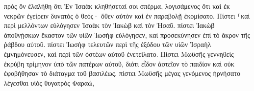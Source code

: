 \documentclass{openreader}
\begin{document}
πρὸς ὃν ἐλαλήθη ὅτι Ἐν Ἰσαὰκ κληθήσεταί σοι σπέρμα, 
λογισάμενος ὅτι καὶ ἐκ νεκρῶν ἐγείρειν δυνατὸς ὁ θεός· ὅθεν αὐτὸν καὶ ἐν παραβολῇ ἐκομίσατο. 
Πίστει ⸀καὶ περὶ μελλόντων εὐλόγησεν Ἰσαὰκ τὸν Ἰακὼβ καὶ τὸν Ἠσαῦ. 
πίστει Ἰακὼβ ἀποθνῄσκων ἕκαστον τῶν υἱῶν Ἰωσὴφ εὐλόγησεν, καὶ προσεκύνησεν ἐπὶ τὸ ἄκρον τῆς ῥάβδου αὐτοῦ. 
πίστει Ἰωσὴφ τελευτῶν περὶ τῆς ἐξόδου τῶν υἱῶν Ἰσραὴλ ἐμνημόνευσεν, καὶ περὶ τῶν ὀστέων αὐτοῦ ἐνετείλατο. 
Πίστει Μωϋσῆς γεννηθεὶς ἐκρύβη τρίμηνον ὑπὸ τῶν πατέρων αὐτοῦ, διότι εἶδον ἀστεῖον τὸ παιδίον καὶ οὐκ ἐφοβήθησαν τὸ διάταγμα τοῦ βασιλέως. 
πίστει Μωϋσῆς μέγας γενόμενος ἠρνήσατο λέγεσθαι υἱὸς θυγατρὸς Φαραώ, 
\end{document}

